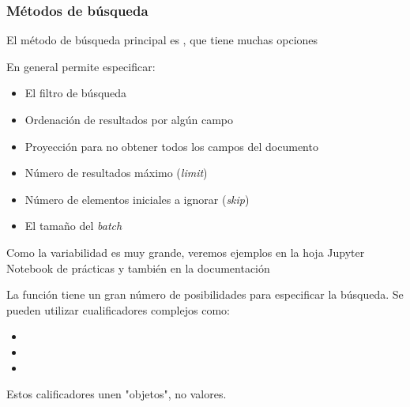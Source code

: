 \subsubsection{Métodos de búsqueda}
El método de búsqueda principal es , que tiene muchas opciones

En general permite especificar:
\begin{itemize}
	\item El filtro de búsqueda
	\item Ordenación de resultados por algún campo
	\item Proyección para no obtener todos los campos del documento
	\item Número de resultados máximo (\textit{limit})
	\item Número de elementos iniciales a ignorar (\textit{skip})
	\item El tamaño del \textit{batch}
\end{itemize}
Como la variabilidad es muy grande, veremos ejemplos en la hoja Jupyter Notebook de prácticas y también en la documentación

La función  tiene un gran número de posibilidades para especificar la búsqueda. Se pueden utilizar cualificadores complejos como:
\begin{itemize}
	\item {}
	\item {}
	\item {}
\end{itemize}
Estos calificadores unen "objetos", no valores.

